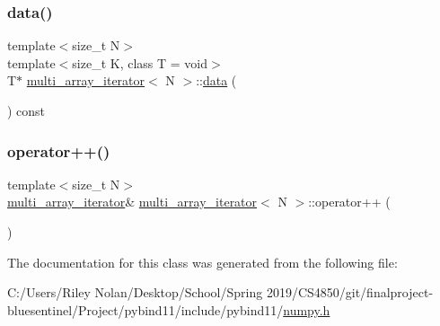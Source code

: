 \subsubsection{\texorpdfstring{data()}{data()}}
{\footnotesize\ttfamily template$<$size\+\_\+t N$>$ \\
template$<$size\+\_\+t K, class T  = void$>$ \\
T$\ast$ \mbox{\hyperlink{classmulti__array__iterator}{multi\+\_\+array\+\_\+iterator}}$<$ N $>$\+::\mbox{\hyperlink{_s_d_l__opengl_8h_a2e335d56e2846b0fea47eed068b2d34a}{data}} (\begin{DoxyParamCaption}{ }\end{DoxyParamCaption}) const\hspace{0.3cm}{\ttfamily [inline]}}

\mbox{\label{classmulti__array__iterator_a7e20dd4a6014bf9d69995f6e8825ee90}} 
\subsubsection{\texorpdfstring{operator++()}{operator++()}}
{\footnotesize\ttfamily template$<$size\+\_\+t N$>$ \\
\mbox{\hyperlink{classmulti__array__iterator}{multi\+\_\+array\+\_\+iterator}}\& \mbox{\hyperlink{classmulti__array__iterator}{multi\+\_\+array\+\_\+iterator}}$<$ N $>$\+::operator++ (\begin{DoxyParamCaption}{ }\end{DoxyParamCaption})\hspace{0.3cm}{\ttfamily [inline]}}



The documentation for this class was generated from the following file\+:\begin{DoxyCompactItemize}
\item 
C\+:/\+Users/\+Riley Nolan/\+Desktop/\+School/\+Spring 2019/\+C\+S4850/git/finalproject-\/bluesentinel/\+Project/pybind11/include/pybind11/\mbox{\hyperlink{numpy_8h}{numpy.\+h}}\end{DoxyCompactItemize}
